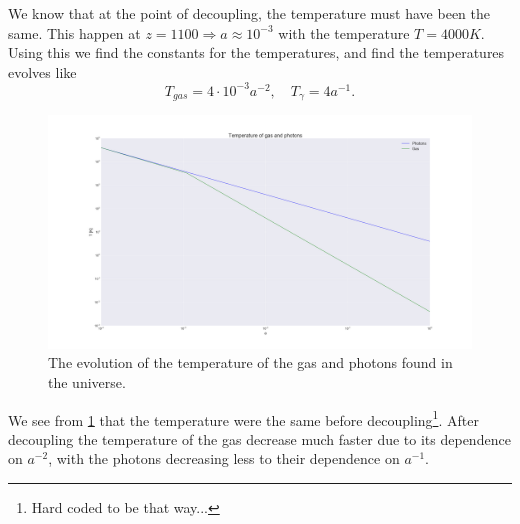 \documentclass[a4paper,norsk, 10pt]{article}
\begin{document}
We know that at the point of decoupling, the temperature must have been the same. This happen at $z = 1100 \Rightarrow a \approx 10^{-3}$ with the temperature $T = 4000K$. Using this we find the constants for the temperatures, and find the temperatures evolves like
\begin{equation}
T_{gas} = 4\cdot 10^{-3}a^{-2}, \quad T_{\gamma} = 4a^{-1}.
\end{equation}

\begin{figure}[!h]
\centering
\includegraphics[scale=0.25]{temp}
\caption{The evolution of the temperature of the gas and photons found in the universe.}\label{fig:temp}
\end{figure}

We see from \ref{fig:temp} that the temperature were the same before decoupling\footnote{Hard coded to be that way...}. After decoupling the temperature of the gas decrease much faster due to its dependence on $a^{-2}$, with the photons decreasing less to their dependence on $a^{-1}$. 
\end{document}
